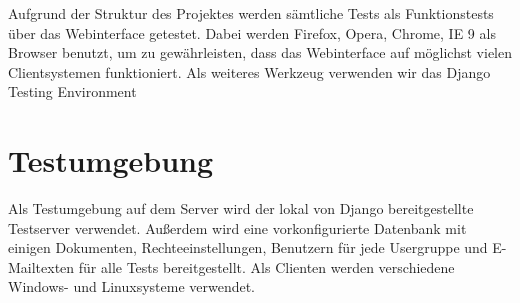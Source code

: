 
Aufgrund der Struktur des Projektes werden sämtliche Tests als Funktionstests
über das Webinterface getestet. Dabei werden Firefox, Opera, Chrome, IE 9 als
Browser benutzt, um zu gewährleisten, dass das Webinterface auf möglichst vielen
Clientsystemen funktioniert. Als weiteres Werkzeug verwenden wir das Django
Testing Environment

\section{Testumgebung}

Als Testumgebung auf dem Server wird der lokal von Django bereitgestellte Testserver
verwendet. Außerdem wird eine vorkonfigurierte Datenbank mit einigen
Dokumenten, Rechteeinstellungen, Benutzern für jede Usergruppe und E-Mailtexten
für alle Tests bereitgestellt. Als Clienten werden verschiedene Windows- und 
Linuxsysteme verwendet.
